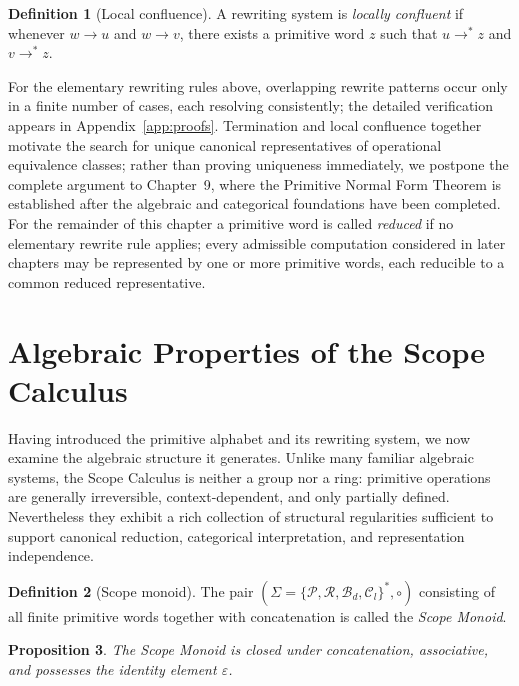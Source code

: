 \documentclass[11pt,twoside,openright]{book}
\numberwithin{equation}{chapter}
\theoremstyle{definition}
\newtheorem{definition}{Definition}[chapter]
\theoremstyle{plain}
\newtheorem{proposition}[definition]{Proposition}
\theoremstyle{remark}
\theoremstyle{definition}
\newcommand{\Alphabet}{\Sigma}
\newcommand{\Pop}{\mathcal{P}}
\newcommand{\Refuse}{\mathcal{R}}
\newcommand{\Bind}{\mathcal{B}_d}
\newcommand{\Collapse}{\mathcal{C}_l}
\newcommand{\ScopeAlphabet}{\Alphabet=\{\Pop,\Refuse,\Bind,\Collapse\}}
\begin{document}
\begin{definition}[Local confluence]
A rewriting system is \emph{locally confluent} if whenever
$w\longrightarrow u$ and $w\longrightarrow v$, there exists a primitive
word $z$ such that $u\longrightarrow^{*}z$ and $v\longrightarrow^{*}z$.
\end{definition}

For the elementary rewriting rules above, overlapping rewrite patterns
occur only in a finite number of cases, each resolving consistently; the
detailed verification appears in Appendix~\ref{app:proofs}. Termination and local
confluence together motivate the search for unique canonical
representatives of operational equivalence classes; rather than proving
uniqueness immediately, we postpone the complete argument to Chapter~9,
where the Primitive Normal Form Theorem is established after the
algebraic and categorical foundations have been completed. For the
remainder of this chapter a primitive word is called \emph{reduced} if no
elementary rewrite rule applies; every admissible computation considered
in later chapters may be represented by one or more primitive words, each
reducible to a common reduced representative.

\section{Algebraic Properties of the Scope Calculus}

Having introduced the primitive alphabet and its rewriting system, we now
examine the algebraic structure it generates. Unlike many familiar
algebraic systems, the Scope Calculus is neither a group nor a ring:
primitive operations are generally irreversible, context-dependent, and
only partially defined. Nevertheless they exhibit a rich collection of
structural regularities sufficient to support canonical reduction,
categorical interpretation, and representation independence.

\begin{definition}[Scope monoid]
The pair $(\ScopeAlphabet^{*},\circ)$ consisting of all finite primitive
words together with concatenation is called the \emph{Scope Monoid}.
\end{definition}

\begin{proposition}
The Scope Monoid is closed under concatenation, associative, and possesses
the identity element $\varepsilon$.
\end{proposition}
\end{document}
